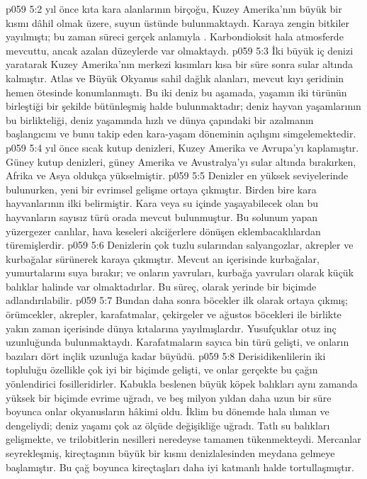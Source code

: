 \vs p059 5:2  yıl önce kıta kara alanlarının birçoğu, Kuzey Amerika’nın büyük bir kısmı dâhil olmak üzere, suyun üstünde bulunmaktaydı. Karaya zengin bitkiler yayılmıştı; bu zaman süreci gerçek anlamıyla . Karbondioksit hala atmosferde mevcuttu, ancak azalan düzeylerde var olmaktaydı.
\vs p059 5:3 İki büyük iç denizi yaratarak Kuzey Amerika’nın merkezi kısımları kısa bir süre sonra sular altında kalmıştır. Atlas ve Büyük Okyanus sahil dağlık alanları, mevcut kıyı şeridinin hemen ötesinde konumlanmıştı. Bu iki deniz bu aşamada, yaşamın iki türünün birleştiği bir şekilde bütünleşmiş halde bulunmaktadır; deniz hayvan yaşamlarının bu birlikteliği, deniz yaşamında hızlı ve dünya çapındaki bir azalmanın başlangıcını ve bunu takip eden kara\hyp{}yaşam döneminin açılışını simgelemektedir.
\vs p059 5:4  yıl önce sıcak kutup denizleri, Kuzey Amerika ve Avrupa’yı kaplamıştır. Güney kutup denizleri, güney Amerika ve Avustralya’yı sular altında bırakırken, Afrika ve Asya oldukça yükselmiştir.
\vs p059 5:5 Denizler en yüksek seviyelerinde bulunurken, yeni bir evrimsel gelişme  ortaya çıkmıştır. Birden bire kara hayvanlarının ilki belirmiştir. Kara veya su içinde yaşayabilecek olan bu hayvanların sayısız türü orada mevcut bulunmuştur. Bu solunum yapan yüzergezer canlılar, hava keseleri akciğerlere dönüşen eklembacaklılardan türemişlerdir.
\vs p059 5:6 Denizlerin çok tuzlu sularından salyangozlar, akrepler ve kurbağalar sürünerek karaya çıkmıştır. Mevcut an içerisinde kurbağalar, yumurtalarını suya bırakır; ve onların yavruları, kurbağa yavruları olarak küçük balıklar halinde var olmaktadırlar. Bu süreç,  olarak yerinde bir biçimde adlandırılabilir.
\vs p059 5:7 Bundan daha sonra böcekler ilk olarak ortaya çıkmış; örümcekler, akrepler, karafatmalar, çekirgeler ve ağustos böcekleri ile birlikte yakın zaman içerisinde dünya kıtalarına yayılmışlardır. Yusufçuklar otuz inç uzunluğunda bulunmaktaydı. Karafatmaların sayıca bin türü gelişti, ve onların bazıları dört inçlik uzunluğa kadar büyüdü.
\vs p059 5:8 Derisidikenlilerin iki topluluğu özellikle çok iyi bir biçimde gelişti, ve onlar gerçekte bu çağın yönlendirici fosilleridirler. Kabukla beslenen büyük köpek balıkları aynı zamanda yüksek bir biçimde evrime uğradı, ve beş milyon yıldan daha uzun bir süre boyunca onlar okyanusların hâkimi oldu. İklim bu dönemde hala ılıman ve dengeliydi; deniz yaşamı çok az ölçüde değişikliğe uğradı. Tatlı su balıkları gelişmekte, ve trilobitlerin nesilleri neredeyse tamamen tükenmekteydi. Mercanlar seyrekleşmiş, kireçtaşının büyük bir kısmı denizlalesinden meydana gelmeye başlamıştır. Bu çağ boyunca kireçtaşları daha iyi katmanlı halde tortullaşmıştır.
